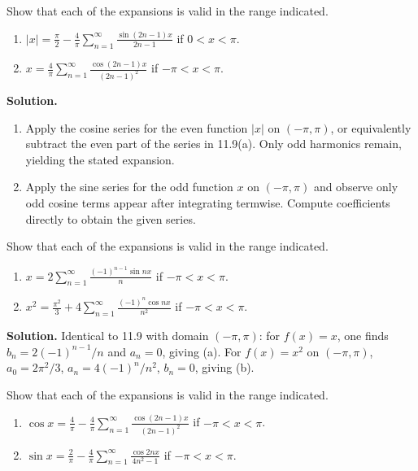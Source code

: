\begin{problembox}
Show that each of the expansions is valid in the range indicated.
\begin{enumerate}[label=(\alph*)]
\item $|x| = \frac{\pi}{2} - \frac{4}{\pi} \sum_{n=1}^\infty \frac{\sin (2n - 1)x}{2n - 1}$ if $0 < x < \pi$.
\item $x = \frac{4}{\pi} \sum_{n=1}^\infty \frac{\cos (2n - 1)x}{(2n - 1)^2}$ if $-\pi < x < \pi$.
\end{enumerate}
\end{problembox}

\noindent\textbf{Solution.}
\begin{enumerate}[label=(\alph*)]
\item Apply the cosine series for the even function $|x|$ on $(-\pi,\pi)$, or equivalently subtract the even part of the series in 11.9(a). Only odd harmonics remain, yielding the stated expansion.
\item Apply the sine series for the odd function $x$ on $(-\pi,\pi)$ and observe only odd cosine terms appear after integrating termwise. Compute coefficients directly to obtain the given series.
\end{enumerate}

\begin{problembox}
Show that each of the expansions is valid in the range indicated.
\begin{enumerate}[label=(\alph*)]
\item $x = 2 \sum_{n=1}^\infty \frac{(-1)^{n-1} \sin nx}{n}$ if $-\pi < x < \pi$.
\item $x^2 = \frac{\pi^2}{3} + 4 \sum_{n=1}^\infty \frac{(-1)^n \cos nx}{n^2}$ if $-\pi < x < \pi$.
\end{enumerate}
\end{problembox}

\noindent\textbf{Solution.}
Identical to 11.9 with domain $(-\pi,\pi)$: for $f(x)=x$, one finds $b_n=2(-1)^{n-1}/n$ and $a_n=0$, giving (a). For $f(x)=x^2$ on $(-\pi,\pi)$, $a_0=2\pi^2/3$, $a_n=4(-1)^n/n^2$, $b_n=0$, giving (b).

\begin{problembox}
Show that each of the expansions is valid in the range indicated.
\begin{enumerate}[label=(\alph*)]
\item $\cos x = \frac{4}{\pi} - \frac{4}{\pi} \sum_{n=1}^\infty \frac{\cos (2n - 1)x}{(2n - 1)^2}$ if $-\pi < x < \pi$.
\item $\sin x = \frac{2}{\pi} - \frac{4}{\pi} \sum_{n=1}^\infty \frac{\cos 2nx}{4n^2 - 1}$ if $-\pi < x < \pi$.
\end{enumerate}
\end{problembox}

